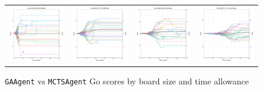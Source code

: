 \begin{figure}
\begin{tabular}{cccc}
\hspace{-0.5cm}\includegraphics[width = 1.55in]{images/Visualizations/GAvsMCTS/8000ms5x5.png} &
\hspace{-0.5cm}\includegraphics[width = 1.55in]{images/Visualizations/GAvsMCTS/8000ms7x7.png} &
\hspace{-0.5cm}\includegraphics[width = 1.55in]{images/Visualizations/GAvsMCTS/8000ms9x9.png} &
\hspace{-0.5cm}\includegraphics[width = 1.55in]{images/Visualizations/GAvsMCTS/8000ms11x11.png} \\
\end{tabular}
\caption{\texttt{GAAgent} vs \texttt{MCTSAgent} Go scores by board size and time allowance}
\label{app:gamctsscore}
\end{figure}

